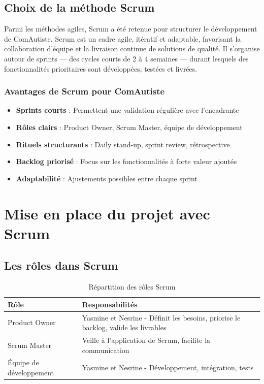 \documentclass[12pt,a4paper]{report}
\begin{document}
\subsection{Choix de la méthode Scrum}

Parmi les méthodes agiles, Scrum a été retenue pour structurer le développement de ComAutiste. Scrum est un cadre agile, itératif et adaptable, favorisant la collaboration d'équipe et la livraison continue de solutions de qualité. Il s'organise autour de sprints — des cycles courts de 2 à 4 semaines — durant lesquels des fonctionnalités prioritaires sont développées, testées et livrées.

\subsubsection{Avantages de Scrum pour ComAutiste}

\begin{itemize}
    \item \textbf{Sprints courts} : Permettent une validation régulière avec l'encadrante
    \item \textbf{Rôles clairs} : Product Owner, Scrum Master, équipe de développement
    \item \textbf{Rituels structurants} : Daily stand-up, sprint review, rétrospective
    \item \textbf{Backlog priorisé} : Focus sur les fonctionnalités à forte valeur ajoutée
    \item \textbf{Adaptabilité} : Ajustements possibles entre chaque sprint
\end{itemize}

\section{Mise en place du projet avec Scrum}

\subsection{Les rôles dans Scrum}

\begin{table}[h]
\centering
\begin{tabular}{|p{4cm}|p{10cm}|}
\hline
\textbf{Rôle} & \textbf{Responsabilités} \\
\hline
Product Owner & Yasmine et Nesrine  - Définit les besoins, priorise le backlog, valide les livrables \\
\hline
Scrum Master &  Veille à l'application de Scrum, facilite la communication \\
\hline
Équipe de développement & Yasmine et Nesrine  - Développement, intégration, tests \\
\hline
\end{tabular}
\caption{Répartition des rôles Scrum}
\end{table}
\end{document}
